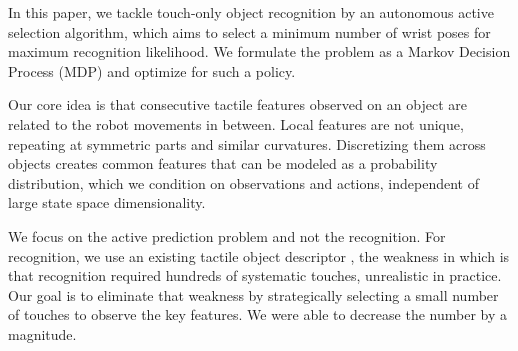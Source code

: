 \documentclass[letterpaper, 10 pt, conference]{ieeeconf}  %
\begin{document}

In this paper, we tackle touch-only object recognition by an autonomous active selection algorithm, which aims to select a minimum number of wrist poses for maximum recognition likelihood.
We formulate the problem as a Markov Decision Process (MDP) and optimize for such a policy.

Our core idea is that consecutive tactile features observed on an object are related to the robot movements in between. Local features are not unique, repeating at symmetric parts and similar curvatures. Discretizing them across objects creates common features that can be modeled as a probability distribution,
which we condition on observations and actions, independent of large state space dimensionality.

We focus on the active prediction problem and not the recognition. For recognition, we use an existing tactile object descriptor \cite{triangles}, the weakness in which is that recognition required hundreds of systematic touches, unrealistic in practice. Our goal is to eliminate that weakness by strategically selecting a small number of touches to observe the key features. We were able to decrease the number by a magnitude.
\end{document}
